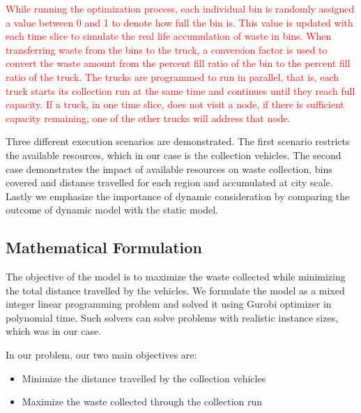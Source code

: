 \documentclass[12pt]{article}
\begin{document}
\textcolor{red}{While running the optimization process, each individual bin is randomly assigned a value between 0 and 1 to denote how full the bin is. This value is updated with each time slice to simulate the real life accumulation of waste in bins. When transferring waste from the bins to the truck, a conversion factor is used to convert the waste amount from the percent fill ratio of the bin to the percent fill ratio of the truck. The trucks are programmed to run in parallel, that is, each truck starts its collection run at the same time and continues until they reach full capacity. If a truck, in one time slice, does not visit a node, if there is sufficient capacity remaining, one of the other trucks will address that node.}

Three different execution scenarios are demonstrated. The first scenario restricts the available resources, which in our case is the collection vehicles. The second case demonstrates the impact of available resources on waste collection, bins covered and distance travelled for each region and accumulated at city scale. Lastly we emphasize the importance of dynamic consideration by comparing the outcome of dynamic model with the static model.

\subsection {Mathematical Formulation}

The objective of the model is to maximize the waste collected while minimizing the total distance travelled by the vehicles. We formulate the model as a mixed integer linear programming problem and solved it using Gurobi optimizer \cite{gurobi} in polynomial time. Such solvers can solve problems with realistic instance sizes, which was in our case.

In our problem, our two main objectives are:
\begin{itemize}
    \item Minimize the distance travelled by the collection vehicles
    \item Maximize the waste collected through the collection run
\end{itemize}
\end{document}
